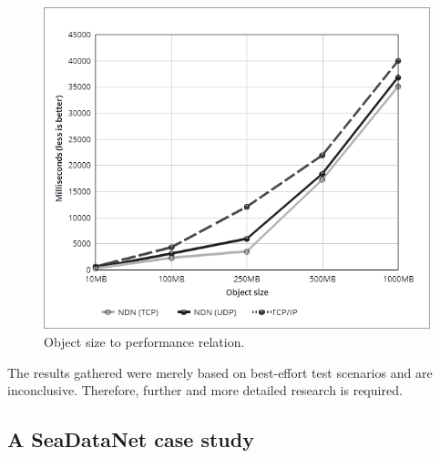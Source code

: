 \documentclass[conference]{IEEEtran}
\begin{document}
\begin{figure}[H]
\centering
\includegraphics[width=\columnwidth]{images/linechart5.png}
\caption{Object size to performance relation.}
\label{fig:perftest-6}
\end{figure}

The results gathered were merely based on best-effort test scenarios and are inconclusive. Therefore, further and more detailed research is required.

\subsection{A SeaDataNet case study} %

\end{document}

